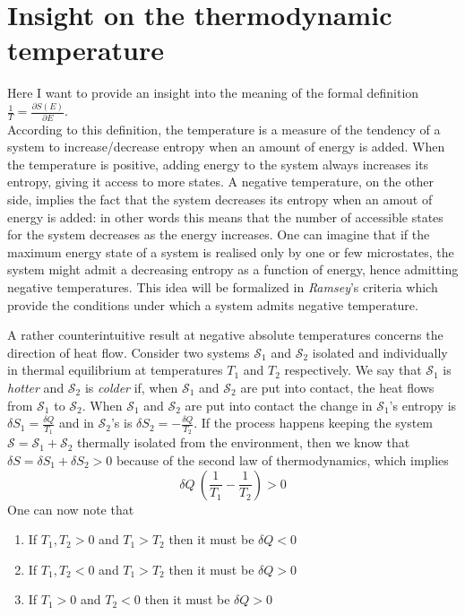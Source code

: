\section{Insight on the thermodynamic temperature}
Here I want to provide an insight into the meaning of the formal definition $\frac{1}{T} = \frac{\partial S(E)}{\partial E}$. \\
According to this definition, the temperature is a measure of the tendency of a system to increase/decrease entropy when an amount of energy is added. When the temperature is positive, adding energy to the system always 
increases its entropy, giving it access to more states. A negative temperature, on the other side, implies the fact that the system decreases its entropy when an amout of energy is added: in other 
words this means that the number of accessible states for the system decreases as the energy increases. One can imagine that if the maximum energy state of a system is realised only by one or few microstates, the system might admit a decreasing 
entropy as a function of energy, hence admitting negative temperatures. This idea will be formalized in \emph{Ramsey}'s criteria which provide the conditions under which a system admits negative temperature. \par
\vspace{15pt}
A rather counterintuitive result at negative absolute temperatures concerns the direction of heat flow. Consider two systems $\mathcal{S}_1$ and $\mathcal{S}_2$ isolated and individually in thermal equilibrium at temperatures $T_1$ and $T_2$ respectively. We say that $\mathcal{S}_1$ is \textit{hotter} and $\mathcal{S}_2$ is \textit{colder} if, when 
$\mathcal{S}_1$ and $\mathcal{S}_2$ are put into contact, the heat flows from $\mathcal{S}_1$ to $\mathcal{S}_2$. When $\mathcal{S}_1$ and $\mathcal{S}_2$ are put into contact the change in $\mathcal{S}_1$'s entropy is $\delta S_1 = \frac{\delta Q}{T_1}$ and in $\mathcal{S}_2$'s is $\delta S_2 = -\frac{\delta Q}{T_2}$. If the process happens keeping 
the system $\mathcal{S} = \mathcal{S}_1 + \mathcal{S}_2$ thermally isolated from the environment, then we know that $\delta S = \delta S_1 + \delta S_2 > 0$ because of the second law of thermodynamics, which implies 
\begin{equation*}
    \delta Q \ \left(\frac{1}{T_1} - \frac{1}{T_2}\right) > 0
\end{equation*}
One can now note that
\begin{enumerate}
    \item If $T_1, T_2 > 0$ and $T_1 > T_2$ then it must be $\delta Q < 0$
    \item If $T_1, T_2 < 0$ and $T_1 > T_2$ then it must be $\delta Q > 0$
    \item If $T_1 > 0$ and $T_2 < 0$ then it must be $\delta Q > 0$
\end{enumerate}
